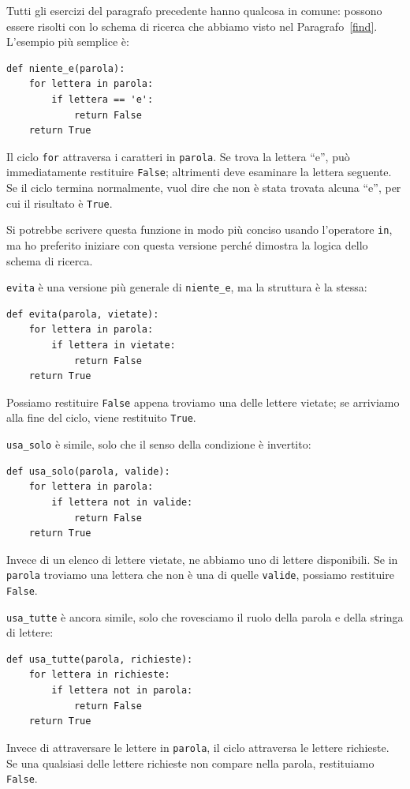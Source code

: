 \documentclass[10pt]{book}
\begin{document}
Tutti gli esercizi del paragrafo precedente hanno qualcosa in comune: possono essere risolti con lo schema di ricerca che abbiamo visto nel Paragrafo~\ref{find}.  L'esempio più semplice è:

\begin{verbatim}
def niente_e(parola):
    for lettera in parola:
        if lettera == 'e':
            return False
    return True
\end{verbatim}
%
Il ciclo {\tt for} attraversa i caratteri in {\tt parola}.  Se trova la lettera  ``e'', può immediatamente restituire {\tt False}; altrimenti deve esaminare la lettera seguente. Se il ciclo termina normalmente, vuol dire che non è stata trovata alcuna ``e'', per cui il risultato è {\tt True}.

Si potrebbe scrivere questa funzione in modo più conciso usando l'operatore {\tt in}, ma ho preferito iniziare con questa versione perché dimostra la logica dello schema di ricerca.

{\tt evita} è una versione più generale di \verb"niente_e", ma la struttura è la stessa:

\begin{verbatim}
def evita(parola, vietate):
    for lettera in parola:
        if lettera in vietate:
            return False
    return True
\end{verbatim}
%
Possiamo restituire {\tt False} appena troviamo una delle lettere vietate; se arriviamo alla fine del ciclo, viene restituito {\tt True}.

\verb"usa_solo" è simile, solo che il senso della condizione è invertito:

\begin{verbatim}
def usa_solo(parola, valide):
    for lettera in parola: 
        if lettera not in valide:
            return False
    return True
\end{verbatim}
%
Invece di un elenco di lettere vietate, ne abbiamo uno di lettere disponibili. Se in {\tt parola} troviamo una lettera che non è una di quelle {\tt valide}, possiamo restituire {\tt False}.

\verb"usa_tutte" è ancora simile, solo che rovesciamo il ruolo della parola e della stringa di lettere:

\begin{verbatim}
def usa_tutte(parola, richieste):
    for lettera in richieste: 
        if lettera not in parola:
            return False
    return True
\end{verbatim}
%
Invece di attraversare le lettere in {\tt parola}, il ciclo attraversa le lettere richieste. Se una qualsiasi delle lettere richieste non compare nella parola, restituiamo {\tt False}.
\end{document}
